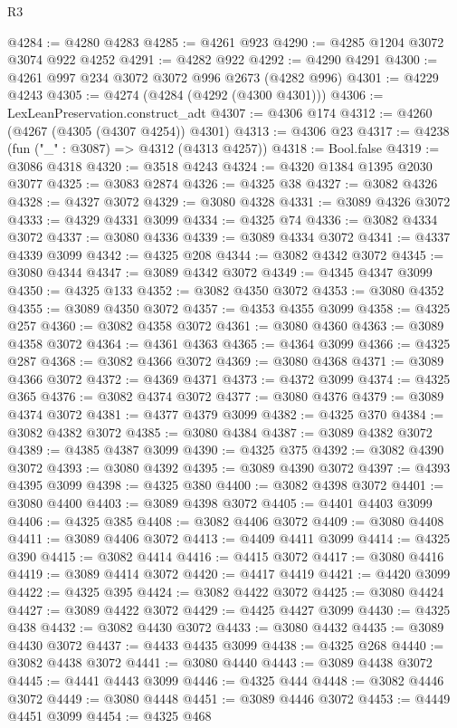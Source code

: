 \begin{lexlean}{R3}
\begin{coremodule}
@4284 := @4280 @4283
@4285 := @4261 @923
@4290 := @4285 @1204 @3072 @3074 @922 @4252
@4291 := @4282 @922
@4292 := @4290 @4291
@4300 := @4261 @997 @234 @3072 @3072 @996 @2673 (@4282 @996)
@4301 := @4229 @4243
@4305 := @4274 (@4284 (@4292 (@4300 @4301)))
@4306 := LexLeanPreservation.construct_adt
@4307 := @4306 @174
@4312 := @4260 (@4267 (@4305 (@4307 @4254)) @4301)
@4313 := @4306 @23
@4317 := @4238 (fun ("_" : @3087) => @4312 (@4313 @4257))
@4318 := Bool.false
@4319 := @3086 @4318
@4320 := @3518 @4243
@4324 := @4320 @1384 @1395 @2030 @3077
@4325 := @3083 @2874
@4326 := @4325 @38
@4327 := @3082 @4326
@4328 := @4327 @3072
@4329 := @3080 @4328
@4331 := @3089 @4326 @3072
@4333 := @4329 @4331 @3099
@4334 := @4325 @74
@4336 := @3082 @4334 @3072
@4337 := @3080 @4336
@4339 := @3089 @4334 @3072
@4341 := @4337 @4339 @3099
@4342 := @4325 @208
@4344 := @3082 @4342 @3072
@4345 := @3080 @4344
@4347 := @3089 @4342 @3072
@4349 := @4345 @4347 @3099
@4350 := @4325 @133
@4352 := @3082 @4350 @3072
@4353 := @3080 @4352
@4355 := @3089 @4350 @3072
@4357 := @4353 @4355 @3099
@4358 := @4325 @257
@4360 := @3082 @4358 @3072
@4361 := @3080 @4360
@4363 := @3089 @4358 @3072
@4364 := @4361 @4363
@4365 := @4364 @3099
@4366 := @4325 @287
@4368 := @3082 @4366 @3072
@4369 := @3080 @4368
@4371 := @3089 @4366 @3072
@4372 := @4369 @4371
@4373 := @4372 @3099
@4374 := @4325 @365
@4376 := @3082 @4374 @3072
@4377 := @3080 @4376
@4379 := @3089 @4374 @3072
@4381 := @4377 @4379 @3099
@4382 := @4325 @370
@4384 := @3082 @4382 @3072
@4385 := @3080 @4384
@4387 := @3089 @4382 @3072
@4389 := @4385 @4387 @3099
@4390 := @4325 @375
@4392 := @3082 @4390 @3072
@4393 := @3080 @4392
@4395 := @3089 @4390 @3072
@4397 := @4393 @4395 @3099
@4398 := @4325 @380
@4400 := @3082 @4398 @3072
@4401 := @3080 @4400
@4403 := @3089 @4398 @3072
@4405 := @4401 @4403 @3099
@4406 := @4325 @385
@4408 := @3082 @4406 @3072
@4409 := @3080 @4408
@4411 := @3089 @4406 @3072
@4413 := @4409 @4411 @3099
@4414 := @4325 @390
@4415 := @3082 @4414
@4416 := @4415 @3072
@4417 := @3080 @4416
@4419 := @3089 @4414 @3072
@4420 := @4417 @4419
@4421 := @4420 @3099
@4422 := @4325 @395
@4424 := @3082 @4422 @3072
@4425 := @3080 @4424
@4427 := @3089 @4422 @3072
@4429 := @4425 @4427 @3099
@4430 := @4325 @438
@4432 := @3082 @4430 @3072
@4433 := @3080 @4432
@4435 := @3089 @4430 @3072
@4437 := @4433 @4435 @3099
@4438 := @4325 @268
@4440 := @3082 @4438 @3072
@4441 := @3080 @4440
@4443 := @3089 @4438 @3072
@4445 := @4441 @4443 @3099
@4446 := @4325 @444
@4448 := @3082 @4446 @3072
@4449 := @3080 @4448
@4451 := @3089 @4446 @3072
@4453 := @4449 @4451 @3099
@4454 := @4325 @468

\end{coremodule}
\end{lexlean}

